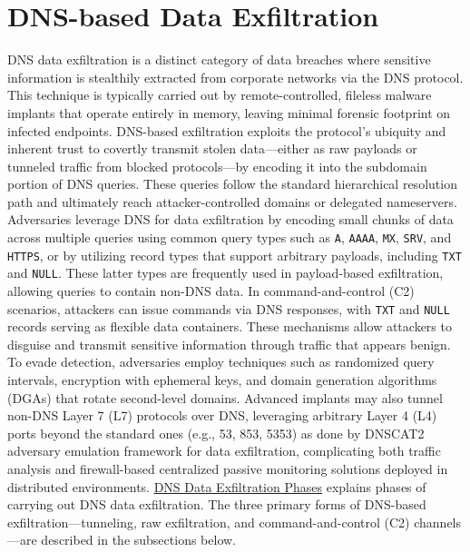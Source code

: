 \documentclass [11pt, proquest] {uwthesis}[2020/02/24]
\begin{document}
\section{DNS-based Data Exfiltration}
DNS data exfiltration is a distinct category of data breaches where sensitive information is stealthily extracted from corporate networks via the DNS protocol. This technique is typically carried out by remote-controlled, fileless malware implants that operate entirely in memory, leaving minimal forensic footprint on infected endpoints. DNS-based exfiltration exploits the protocol’s ubiquity and inherent trust to covertly transmit stolen data—either as raw payloads or tunneled traffic from blocked protocols—by encoding it into the subdomain portion of DNS queries. These queries follow the standard hierarchical resolution path and ultimately reach attacker-controlled domains or delegated nameservers. Adversaries leverage DNS for data exfiltration by encoding small chunks of data across multiple queries using common query types such as \texttt{A}, \texttt{AAAA}, \texttt{MX}, \texttt{SRV}, and \texttt{HTTPS}, or by utilizing record types that support arbitrary payloads, including \texttt{TXT} and \texttt{NULL}. These latter types are frequently used in payload-based exfiltration, allowing queries to contain non-DNS data. In command-and-control (C2) scenarios, attackers can issue commands via DNS responses, with \texttt{TXT} and \texttt{NULL} records serving as flexible data containers. These mechanisms allow attackers to disguise and transmit sensitive information through traffic that appears benign. To evade detection, adversaries employ techniques such as randomized query intervals, encryption with ephemeral keys, and domain generation algorithms (DGAs) that rotate second-level domains. Advanced implants may also tunnel non-DNS Layer 7 (L7) protocols over DNS, leveraging arbitrary Layer 4 (L4) ports beyond the standard ones (e.g., 53, 853, 5353) as done by DNSCAT2 adversary emulation framework for data exfiltration, complicating both traffic analysis and firewall-based centralized passive monitoring solutions deployed in distributed environments.
\newpage
\hyperref[sec:dns c2 flow]{DNS Data Exfiltration Phases} explains phases of carrying out DNS data exfiltration.
The three primary forms of DNS-based exfiltration—tunneling, raw exfiltration, and command-and-control (C2) channels—are described in the subsections below.
\end{document}
